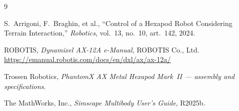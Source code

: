 \documentclass[11pt,a4paper]{article}
\begin{document}
\begin{thebibliography}{9}

S.~Arrigoni, F.~Braghin, et al.,
``Control of a Hexapod Robot Considering Terrain Interaction,''
\emph{Robotics}, vol.~13, no.~10, art.~142, 2024.

ROBOTIS, \emph{Dynamixel AX-12A e-Manual}, ROBOTIS Co., Ltd.
\url{https://emanual.robotis.com/docs/en/dxl/ax/ax-12a/}

Trossen Robotics, \emph{PhantomX AX Metal Hexapod Mark~II --- assembly and
specifications}.

The MathWorks, Inc., \emph{Simscape Multibody User's Guide}, R2025b.

\end{thebibliography}
\end{document}
